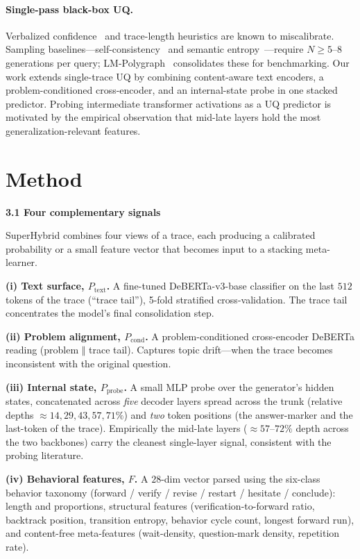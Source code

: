 \documentclass{article}
\begin{document}
\paragraph{Single-pass black-box UQ.} Verbalized confidence~\cite{lin23} and
trace-length heuristics are known to miscalibrate. Sampling
baselines---self-consistency~\cite{wang2022} and semantic
entropy~\cite{kuhn23}---require $N \ge 5$--$8$ generations per query;
LM-Polygraph~\cite{polygraph} consolidates these for benchmarking. Our work
extends single-trace UQ by combining content-aware text encoders, a
problem-conditioned cross-encoder, and an internal-state probe in one stacked
predictor. Probing intermediate transformer activations as a UQ predictor is
motivated by the empirical observation that mid-late layers hold the most
generalization-relevant features.

\section{Method}

\textbf{3.1 Four complementary signals}

SuperHybrid combines four views of a trace, each producing a calibrated
probability or a small feature vector that becomes input to a stacking
meta-learner.

\textbf{(i) Text surface, $P_{\text{text}}$.} A fine-tuned DeBERTa-v3-base
classifier on the last $512$ tokens of the trace (``trace tail''), 5-fold
stratified cross-validation. The trace tail concentrates the model's final
consolidation step.

\textbf{(ii) Problem alignment, $P_{\text{cond}}$.} A problem-conditioned
cross-encoder DeBERTa reading (problem $\Vert$ trace tail). Captures topic
drift---when the trace becomes inconsistent with the original question.

\textbf{(iii) Internal state, $P_{\text{probe}}$.} A small MLP probe over the
generator's hidden states, concatenated across \emph{five} decoder layers
spread across the trunk (relative depths $\approx 14, 29, 43, 57, 71\%$)
and \emph{two} token positions (the answer-marker and the last-token of the
trace). Empirically the mid-late layers ($\approx 57$--$72\%$ depth across
the two backbones) carry the cleanest single-layer signal, consistent with
the probing literature.

\textbf{(iv) Behavioral features, $F$.} A $28$-dim vector parsed using the
six-class behavior taxonomy (forward / verify / revise / restart / hesitate /
conclude): length and proportions, structural features
(verification-to-forward ratio, backtrack position, transition entropy,
behavior cycle count, longest forward run), and content-free meta-features
(wait-density, question-mark density, repetition rate).
\end{document}
